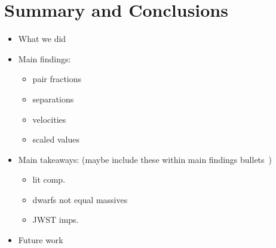 \documentclass[twocolumn]{aastex631}
\newcommand{\kc}[1]{\textcolor{yellow}{\textbf{kc: #1}} }
\begin{document}




\pagebreak
\section{Summary and Conclusions}\label{sec:summary}
\begin{itemize}
    \item What we did 
    \item Main findings:
        \begin{itemize}
            \item pair fractions
            \item separations
            \item velocities
            \item scaled values
        \end{itemize}
    \item Main takeaways: (maybe include these within main findings bullets~)
        \begin{itemize}
            \item lit comp.
            \item dwarfs not equal massives 
            \item JWST imps.
        \end{itemize}
    \item Future work
\end{itemize}



{}

\end{document}
